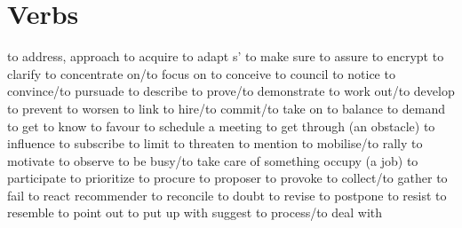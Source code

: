 \section{Verbs}
   {to address, approach}
   {to acquire}
   {to adapt}
 {s'}   {to make sure}
   {to assure}
   {to encrypt}
   {to clarify}
   {to concentrate on/to focus on}
   {to conceive}
   {to council}
   {to notice}
   {to convince/to pursuade}
   {to describe}
   {to prove/to demonstrate}
   {to work out/to develop}
   {to prevent}
   {to worsen}
   {to link}
   {to hire/to commit/to take on}
   {to balance}
   {to demand}
   {to get to know}
   {to favour}
   {to schedule a meeting}
   {to get through (an obstacle)}
   {to influence}
   {to subscribe}
   {to limit}
   {to threaten}
   {to mention}
   {to mobilise/to rally}
   {to motivate}
   {to observe}
   {to be busy/to take care of something}
   {occupy (a job)}
   {to participate}
   {to prioritize}
   {to procure}
   {to proposer}
   {to provoke}
   {to collect/to gather}
   {to fail}
   {to react}
   {recommender}
   {to reconcile}
   {to doubt}
   {to revise}
   {to postpone}
   {to resist}
   {to resemble}
   {to point out}
   {to put up with}
   {suggest}
   {to process/to deal with}
